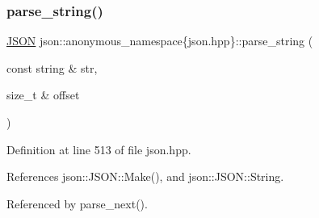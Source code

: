 \subsubsection{\texorpdfstring{parse\+\_\+string()}{parse\_string()}}
{\footnotesize\ttfamily \mbox{\hyperlink{classjson_1_1_j_s_o_n}{J\+S\+ON}} json\+::anonymous\+\_\+namespace\{json.\+hpp\}\+::parse\+\_\+string (\begin{DoxyParamCaption}\item[{const string \&}]{str,  }\item[{size\+\_\+t \&}]{offset }\end{DoxyParamCaption})}



Definition at line 513 of file json.\+hpp.



References json\+::\+J\+S\+O\+N\+::\+Make(), and json\+::\+J\+S\+O\+N\+::\+String.



Referenced by parse\+\_\+next().


